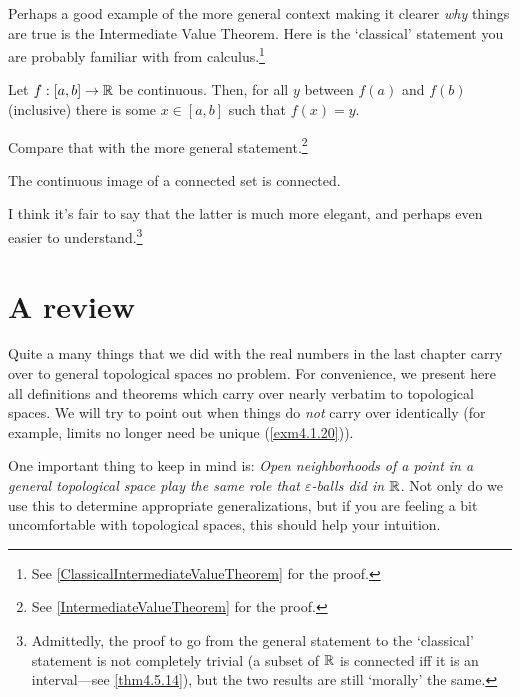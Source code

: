 Perhaps a good example of the more general context making it clearer \emph{why} things are true is the Intermediate Value Theorem.  Here is the `classical' statement you are probably familiar with from calculus.\footnote{See \cref{ClassicalIntermediateValueTheorem} for the proof.}
\begin{textequation}
Let $f:[a,b]\rightarrow \mathbb{R}$ be continuous.  Then, for all $y$ between $f(a)$ and $f(b)$ (inclusive) there is some $x\in [a,b]$ such that $f(x)=y$.
\end{textequation}
Compare that with the more general statement.\footnote{See \cref{IntermediateValueTheorem} for the proof.}
\begin{textequation}
The continuous image of a connected set is connected.
\end{textequation}
I think it's fair to say that the latter is much more elegant, and perhaps even easier to understand.\footnote{Admittedly, the proof to go from the general statement to the `classical' statement is not completely trivial (a subset of $\mathbb{R}$ is connected iff it is an interval---see \cref{thm4.5.14}), but the two results are still `morally' the same.}

\section{A review}

Quite a many things that we did with the real numbers in the last chapter carry over to general topological spaces no problem.  For convenience, we present here all definitions and theorems which carry over nearly verbatim to topological spaces.  We will try to point out when things do \emph{not} carry over identically (for example, limits no longer need be unique (\cref{exm4.1.20})).

One important thing to keep in mind is:  \emph{Open neighborhoods of a point in a general topological space play the same role that $\varepsilon$-balls did in $\mathbb{R}$}.  Not only do we use this to determine appropriate generalizations, but if you are feeling a bit uncomfortable with topological spaces, this should help your intuition.

